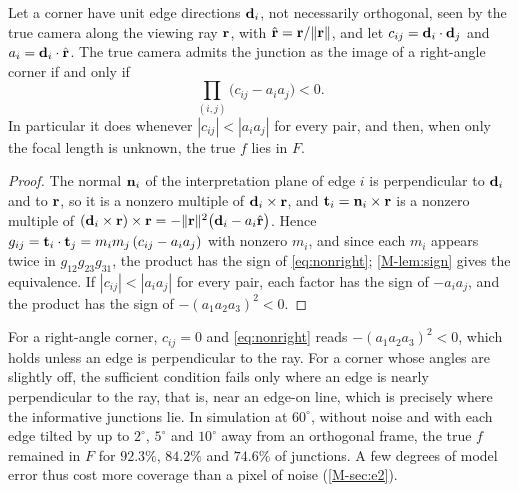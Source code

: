 \begin{proposition}\label{prop:nonright}
Let a corner have unit edge directions $\mathbf{d}_i$, not necessarily orthogonal, seen by the true camera along the viewing ray $\mathbf{r}$, with $\hat{\mathbf{r}}=\mathbf{r}/\|\mathbf{r}\|$, and let $c_{ij}=\mathbf{d}_i\cdot\mathbf{d}_j$ and $a_i=\mathbf{d}_i\cdot\hat{\mathbf{r}}$. The true camera admits the junction as the image of a right-angle corner if and only if
\begin{equation}
\prod_{(i,j)}\bigl(c_{ij}-a_ia_j\bigr)<0 .
\label{eq:nonright}
\end{equation}
In particular it does whenever $|c_{ij}|<|a_ia_j|$ for every pair, and then, when only the focal length is unknown, the true $f$ lies in $F$.
\end{proposition}
\begin{proof}
The normal $\mathbf{n}_i$ of the interpretation plane of edge $i$ is perpendicular to $\mathbf{d}_i$ and to $\mathbf{r}$, so it is a nonzero multiple of $\mathbf{d}_i\times\mathbf{r}$, and $\mathbf{t}_i=\mathbf{n}_i\times\mathbf{r}$ is a nonzero multiple of $(\mathbf{d}_i\times\mathbf{r})\times\mathbf{r}=-\|\mathbf{r}\|^2\bigl(\mathbf{d}_i-a_i\hat{\mathbf{r}}\bigr)$. Hence $g_{ij}=\mathbf{t}_i\cdot\mathbf{t}_j=m_im_j\,(c_{ij}-a_ia_j)$ with nonzero $m_i$, and since each $m_i$ appears twice in $g_{12}g_{23}g_{31}$, the product has the sign of \eqref{eq:nonright}; \cref{M-lem:sign} gives the equivalence. If $|c_{ij}|<|a_ia_j|$ for every pair, each factor has the sign of $-a_ia_j$, and the product has the sign of $-(a_1a_2a_3)^2<0$.
\end{proof}

For a right-angle corner, $c_{ij}=0$ and \eqref{eq:nonright} reads $-(a_1a_2a_3)^2<0$, which holds unless an edge is perpendicular to the ray. For a corner whose angles are slightly off, the sufficient condition fails only where an edge is nearly perpendicular to the ray, that is, near an edge-on line, which is precisely where the informative junctions lie. In simulation at $60^\circ$, without noise and with each edge tilted by up to $2^\circ$, $5^\circ$ and $10^\circ$ away from an orthogonal frame, the true $f$ remained in $F$ for $92.3\%$, $84.2\%$ and $74.6\%$ of junctions. A few degrees of model error thus cost more coverage than a pixel of noise (\cref{M-sec:e2}).

